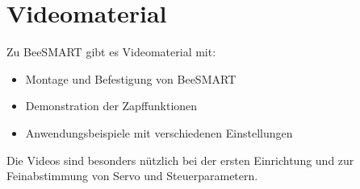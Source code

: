 \documentclass[11pt,a4paper]{article}
\begin{document}
\section{Videomaterial}

Zu BeeSMART gibt es Videomaterial mit:

\begin{itemize}[leftmargin=*]
    \item Montage und Befestigung von BeeSMART
    \item Demonstration der Zapffunktionen
    \item Anwendungsbeispiele mit verschiedenen Einstellungen
\end{itemize}

\vspace{2em}
Die Videos sind besonders nützlich bei der ersten Einrichtung und zur Feinabstimmung von Servo und Steuerparametern.
\vspace{2em}
\end{document}
